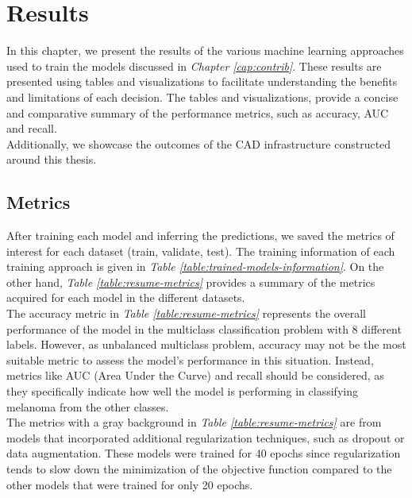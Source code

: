 \chapter{Results} \label{cap:result}

In this chapter, we present the results of the various machine learning
approaches used to train the models discussed in \textit{Chapter
\ref{cap:contrib}}. These results are presented using tables and visualizations
to facilitate understanding the benefits and limitations of each decision. The
tables and visualizations, provide a concise and comparative summary of the
performance metrics, such as accuracy, AUC and recall. \\

Additionally, we showcase the outcomes of the CAD infrastructure constructed
around this thesis.


\section{Metrics}

After training each model and inferring the predictions, we saved the metrics
of interest for each dataset (train, validate, test). The training information
of each training approach is given in \textit{Table
\ref{table:trained-models-information}}. On the other hand, \textit{Table
\ref{table:resume-metrics}} provides a summary of the metrics acquired for each
model in the different datasets. \\

The accuracy metric in \textit{Table \ref{table:resume-metrics}} represents the
overall performance of the model in the multiclass classification problem with
8 different labels. However, as unbalanced multiclass problem, accuracy may not
be the most suitable metric to assess the model's performance in this
situation. Instead, metrics like AUC (Area Under the Curve) and recall should
be considered, as they specifically indicate how well the model is performing
in classifying melanoma from the other classes. \\

The metrics with a gray background in \textit{Table \ref{table:resume-metrics}}
are from models that incorporated additional regularization techniques, such as
dropout or data augmentation. These models were trained for 40 epochs since
regularization tends to slow down the minimization of the objective function
compared to the other models that were trained for only 20 epochs. \\

